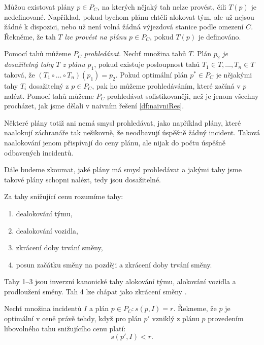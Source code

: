 Můžou existovat plány $p \in P_C$, na kterých nějaký tah nelze provést, čili $T(p)$ je nedefinované.
Například, pokud bychom plánu chtěli alokovat tým, ale už nejsou žádné k dispozici, nebo už není volná žádná výjezdová stanice podle omezení $C$.
Řekněme, že tah $T$ \textit{lze provést na plánu $p \in P_C$}, pokud $T(p)$ je definováno.

Pomocí tahů můžeme $P_C$ \textit{prohledávat}.
Nechť množina tahů $T$.
Plán $p_2$ \textit{je dosažitelný tahy $T$ z plánu $p_1$}, pokud existuje posloupnost tahů $T_1 \in T, \dots, T_n \in T$ taková, že $(T_1 \circ \dots \circ T_n)(p_1) = p_2$.
Pokud optimální plán $p^* \in P_C$ je nějakými tahy $T_i$ dosažitelný z $p \in P_C$, pak ho můžeme prohledáváním, které začíná v $p$ nalézt.
Pomocí tahů můžeme $P_C$ prohledávat sofistikovaněji, než je jenom všechny procházet, jak jsme dělali v naivním řešení \ref{df:naivniRes}.

Některé plány totiž ani nemá smysl prohledávat, jako například plány, které naalokují záchranáře tak nešikovně, že neodbavují úspěšně žádný incident.
Taková naalokování jenom přispívají do ceny plánu, ale nijak do počtu úspěšně odbavených incidentů.

Dále budeme zkoumat, jaké plány má smysl prohledávat a jakými tahy jsme takové plány schopni nalézt, tedy jsou dosažitelné.
\begin{definice}\label{df:invKanTahy}
  Za tahy snižující cenu rozumíme tahy:
  \begin{enumerate}
    \item
      dealokování týmu,

    \item
      dealokování vozidla,

    \item
      zkrácení doby trvání směny,

    \item
      posun začátku směny na později a zkrácení doby trvání směny.

  \end{enumerate}
\end{definice}

Tahy 1--3 jsou inverzní kanonické tahy alokování týmu, alokování vozidla a prodloužení směny.
Tah 4 lze chápat jako zkrácení směny .

\begin{definice}\label{df:planOptVCene}
  Nechť množina incidentů $I$ a plán $p \in P_C \colon s(p, I) = r$.
  Řekneme, že $p$ je optimální v ceně právě tehdy, když
  pro plán $p'$ vzniklý z plánu $p$ provedením libovolného tahu snižujícího cenu platí: 
  \begin{equation*}
    s(p', I) < r.
  \end{equation*}
\end{definice}

